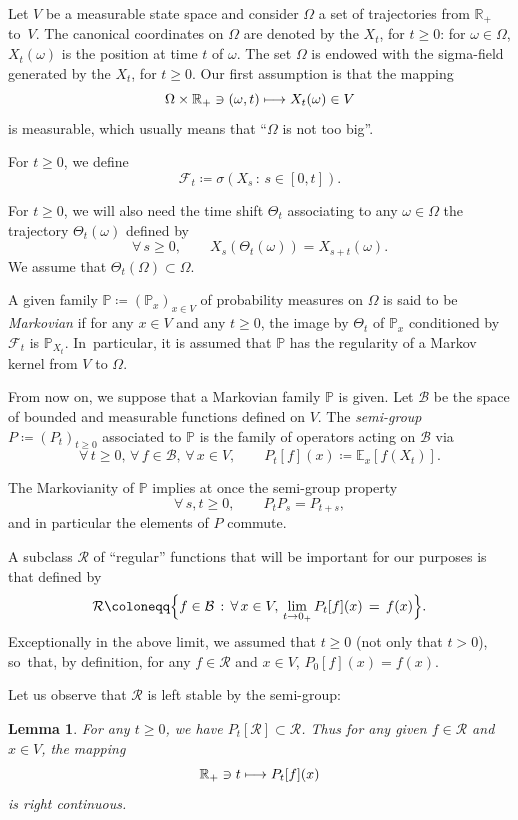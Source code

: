 \documentclass[10pt]{amsart}
\newcommand\mto{\mathchoice{\longmapsto}{\mapsto}{\mapsto}{\mapsto}}
\theoremstyle{plain}
\newtheorem{lemma}[thm]{Lemma}
\theoremstyle{definition}
\newcommand{\EE}{{\mathbb E}}
\newcommand{\RR}{{\mathbb R}}
\newcommand{\PP}{{\mathbb P}}
\newcommand\df{\coloneqq}
\newcommand{\bq}{\begin{equation*}}
\newcommand{\eq}{\end{equation*}}
\newcommand{\fo}{\forall\,}
\newcommand{\st}{\,:\,}
\newcommand{\cB}{\mathcal{B}}
\newcommand{\cF}{\mathcal{F}}
\newcommand{\cR}{\mathcal{R}}
\begin{document}
Let $V$ be a measurable state space and consider $\Omega$ a set of trajectories from $\RR_+$ to~$V$.
The canonical coordinates on $\Omega$ are denoted by the $X_t$, for $t\geq 0$: for $\omega\in\Omega$, $X_t(\omega)$ is the position at time $t$ of $\omega$.
The set $\Omega$ is endowed with the sigma-field generated by the $X_t$, for $t\geq 0$.
Our first assumption is that the mapping
\bq
\Omega\times\RR_+\ni(\omega,t)\mto X_t(\omega)\in V\eq
is measurable, which usually means that ``$\Omega$ is not too big''.
\par
For $t\geq 0$, we define \bq
\cF_t\df \sigma( X_s\st s\in[0,t]).\eq
\par
For $t\geq 0$, we will also need the time shift $\Theta_{t}$ associating to any $\omega\in\Omega$ the trajectory $\Theta_{t}(\omega)$ defined by
\bq
\fo s\geq 0,\qquad X_s(\Theta_{t}(\omega))=X_{s+t}(\omega).\eq
We assume that $\Theta_t(\Omega)\subset \Omega$.
\par
A given family $\PP\df (\PP_x)_{x\in V}$ of probability measures on $\Omega$ is said to be \emph{Markovian} if for any $x\in V$ and any $t\geq 0$, the image by $\Theta_t$ of $\PP_x$ conditioned by
$\cF_t$ is $\PP_{X_t}$. In~particular, it is assumed that $\PP$ has the regularity of a Markov kernel from $V$ to $\Omega$.
\par
From now on, we suppose that a Markovian family $\PP$ is given.
Let $\cB$ be the space of bounded and measurable functions defined on $V$.
The \emph{semi-group} $P\df (P_t)_{t\geq 0}$ associated to $\PP$ is the family of operators acting on $\cB$ via
\bq
\fo t\geq 0,\,\fo f\in\cB,\,\fo x\in V,\qquad P_t[f](x)\df \EE_x[f(X_t)].\eq
\par
The Markovianity of $\PP$ implies at once the semi-group property
\bq
\fo s,t\geq 0,\qquad P_tP_s=P_{t+s},
\eq
and in particular the elements of $P$ commute.\par
A subclass $\cR$ of ``regular'' functions that will be important for our purposes is that defined by
\bq
\cR\df \Bigl\{f\in \cB\st \fo x\in V,\, \lim_{t\to 0_+}P_t[f](x)\,=\, f(x)\Bigr\}.\eq
Exceptionally in the above limit, we assumed that $t\geq 0$ (\ie not only that $t>0$), so~that, by definition, for any $f\in\cR$ and $x\in V$,
$P_0[f](x)=f(x)$.\par
Let us observe that $\cR$ is left stable by the semi-group:
\begin{lemma}\label{lem1}
For any $t\geq 0$, we have $P_t[\cR]\subset\cR$. Thus for any given $f\in\cR$ and $x\in V$, the mapping
\bq
\RR_+\ni t\mto P_t[f](x)\eq
is right continuous.
\end{lemma}
\end{document}
